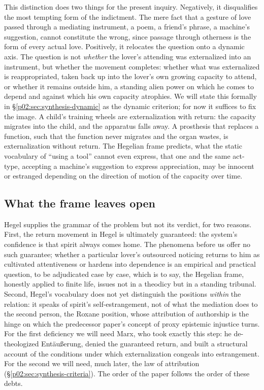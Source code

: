 This distinction does two things for the present inquiry. Negatively, it disqualifies the most tempting form of the indictment. The mere fact that a gesture of love passed through a mediating instrument, a poem, a friend's phrase, a machine's suggestion, cannot constitute the wrong, since passage through otherness is the form of every actual love. Positively, it relocates the question onto a dynamic axis. The question is not \emph{whether} the lover's attending was externalized into an instrument, but whether the movement completes: whether what was externalized is reappropriated, taken back up into the lover's own growing capacity to attend, or whether it remains outside him, a standing alien power on which he comes to depend and against which his own capacity atrophies. We will state this formally in \S\ref{p02:sec:synthesis-dynamic} as the dynamic criterion; for now it suffices to fix the image. A child's training wheels are externalization with return: the capacity migrates into the child, and the apparatus falls away. A prosthesis that replaces a function, such that the function never migrates and the organ wastes, is externalization without return. The Hegelian frame predicts, what the static vocabulary of ``using a tool'' cannot even express, that one and the same act-type, accepting a machine's suggestion to express appreciation, may be innocent or estranged depending on the direction of motion of the capacity over time.

\subsection{What the frame leaves open}
\label{p02:sec:hegel-open}

Hegel supplies the grammar of the problem but not its verdict, for two reasons. First, the return movement in Hegel is ultimately guaranteed: the system's confidence is that spirit always comes home. The phenomena before us offer no such guarantee; whether a particular lover's outsourced noticing returns to him as cultivated attentiveness or hardens into dependence is an empirical and practical question, to be adjudicated case by case, which is to say, the Hegelian frame, honestly applied to finite life, issues not in a theodicy but in a standing tribunal. Second, Hegel's vocabulary does not yet distinguish the positions \emph{within} the relation: it speaks of spirit's self-estrangement, not of what the mediation does to the second person, the Roxane position, whose attribution of authorship is the hinge on which the predecessor paper's concept of proxy epistemic injustice turns. For the first deficiency we will need Marx, who took exactly this step: he de-theologized Ent\"au{\ss}erung, denied the guaranteed return, and built a structural account of the conditions under which externalization congeals into estrangement. For the second we will need, much later, the law of attribution (\S\ref{p02:sec:synthesis-criteria}). The order of the paper follows the order of these debts.

